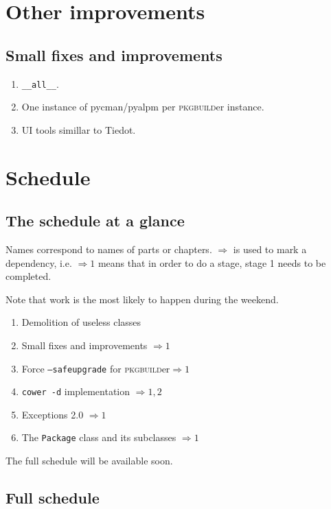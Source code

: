 \documentclass[a4paper,english]{book}
\numberwithin{equation}{section}
\newcommand{\pb}[0]{\textsc{pkgbuild}er}
\newcommand{\p}[1]{\nohyphens{\texttt{#1}}}
\begin{document}
\part{Other improvements}

\chapter{Small fixes and improvements}
\begin{enumerate}
\item \p{\_\_all\_\_}.
\item One instance of pycman/pyalpm per \pb{} instance.
\item UI tools simillar to Tiedot.
\end{enumerate}

\part{Schedule}

\chapter{The schedule at a glance}

Names correspond to names of parts or chapters.  \(\Rightarrow\) is used to mark a dependency, i.e. \(\Rightarrow 1\) means that in order to do a stage, stage 1 needs to be completed.

Note that work is the most likely to happen during the weekend.

\begin{enumerate}
\item Demolition of useless classes
\item Small fixes and improvements \(\Rightarrow 1\)
\item Force \p{--safeupgrade} for \pb \(\Rightarrow 1\)
\item \p{cower -d} implementation \(\Rightarrow 1, 2\)
\item Exceptions 2.0 \(\Rightarrow 1\)
\item The \p{Package} class and its subclasses \(\Rightarrow 1\)
\end{enumerate}

The full schedule will be available soon.

\chapter{Full schedule}
\end{document}
